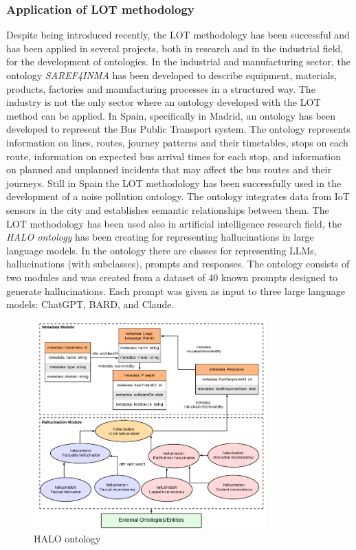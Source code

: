 \subsubsection{Application of LOT methodology}
Despite being introduced recently, the LOT methodology has been successful and has been applied in several projects, both in research and in the industrial field, for the development of ontologies. In the industrial and manufacturing sector, the ontology \textit{SAREF4INMA} \cite{de2020saref4inma} has been developed to describe equipment, materials, products, factories and manufacturing processes in a structured way. The industry is not the only sector where an ontology developed with the LOT method can be applied. In Spain, specifically in Madrid, an ontology has been developed to represent the Bus Public Transport system. \cite{ruckhaus2023applying} The ontology represents information on lines, routes, journey patterns and their timetables, stops on each route, information on expected bus arrival times for each stop, and information on planned and unplanned incidents that may affect the bus routes and their journeys. Still in Spain the LOT methodology has been successfully used in the development of a noise pollution ontology.\cite{espinoza2020using} The ontology integrates data from IoT sensors in the city and establishes semantic relationships between them. The LOT methodology has been used also in artificial intelligence research field, the \textit{HALO ontology} \cite{nananukul2024halo} has been creating for representing hallucinations in large language models. In the ontology there are classes for representing LLMs, hallucinations (with subclasses), prompts and responses. The ontology consists of two modules and was created from a dataset of 40 known prompts designed to generate hallucinations. Each prompt was given as input to three large language models: ChatGPT, BARD, and Claude.
\begin{figure}[H]
    \centering
    \includegraphics[width=0.7\linewidth, height=8cm]{Figures/fig_4.png}
    \caption{HALO ontology}
    \label{fig:enter-label}
\end{figure}
